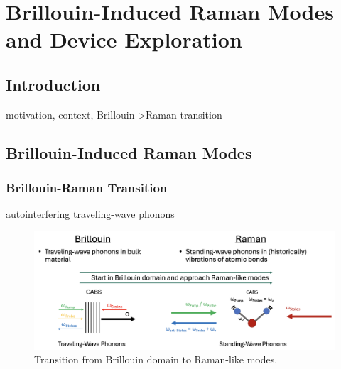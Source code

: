 \setcounter{rownumber}{0}
\singlespacing
\chapter{Brillouin-Induced Raman Modes and Device Exploration}
\label{ch:Raman}
\acresetall

\doublespacing


\section{Introduction}
\label{sec:Raman:Introduction}

motivation, context, Brillouin->Raman transition


\section{Brillouin-Induced Raman Modes}
\label{sec:Raman:Brillouin-Induced}

\subsection{Brillouin-Raman Transition}
\label{subsec:Raman:Brillouin-RamanTransition}

autointerfering traveling-wave phonons

\begin{figure}[t]
  \centering
  \includegraphics[width=\textwidth]{figs/4-Raman/ExploreBrillouinRamanTransition.png}
  \caption{Transition from Brillouin domain to Raman-like modes.}
  \label{fig:BrillouinRamanTransition}
\end{figure}

